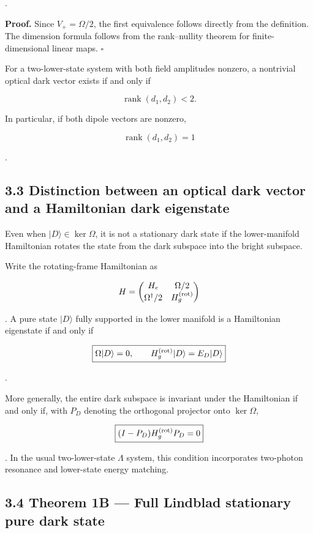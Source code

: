 \documentclass[
  10pt,
  a4paper,
]{article}
\begin{document}
.

\textbf{Proof.} Since \(V_+=\Omega/2\), the first equivalence follows
directly from the definition. The dimension formula follows from the
rank--nullity theorem for finite-dimensional linear maps. \(\square\)

For a two-lower-state system with both field amplitudes nonzero, a
nontrivial optical dark vector exists if and only if

\[
\operatorname{rank}(d_1,d_2)<2.
\]

In particular, if both dipole vectors are nonzero,

\[
\operatorname{rank}(d_1,d_2)=1
\]

.

\subsection{3.3 Distinction between an optical dark vector and a
Hamiltonian dark
eigenstate}\label{distinction-between-an-optical-dark-vector-and-a-hamiltonian-dark-eigenstate}

Even when \(|D\rangle\in\ker\Omega\), it is not a stationary dark state
if the lower-manifold Hamiltonian rotates the state from the dark
subspace into the bright subspace.

Write the rotating-frame Hamiltonian as

\[
H=
\begin{pmatrix}
H_e & \Omega/2\\
\Omega^\dagger/2 & H_g^{(\rm rot)}
\end{pmatrix}
\]

. A pure state \(|D\rangle\) fully supported in the lower manifold is a
Hamiltonian eigenstate if and only if

\[
\boxed{
\Omega|D\rangle=0,
\qquad
H_g^{(\rm rot)}|D\rangle=E_D|D\rangle
}
\]

.

More generally, the entire dark subspace is invariant under the
Hamiltonian if and only if, with \(P_D\) denoting the orthogonal
projector onto \(\ker\Omega\),

\[
\boxed{
(I-P_D)H_g^{(\rm rot)}P_D=0
}
\]

. In the usual two-lower-state \(\Lambda\) system, this condition
incorporates two-photon resonance and lower-state energy matching.

\subsection{3.4 Theorem 1B --- Full Lindblad stationary pure dark
state}\label{theorem-1b-full-lindblad-stationary-pure-dark-state}
\end{document}
